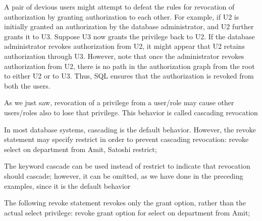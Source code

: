 \documentclass[8pt, a4paper, oneside, twocolumn]{extarticle}
\begin{document}
A pair of devious users might attempt to defeat the rules for revocation
of authorization by granting authorization to each other. For example, if U2 is
initially granted an authorization by the database administrator, and U2 further
grants it to U3. Suppose U3 now grants the privilege back to U2. If the database
administrator revokes authorization from U2, it might appear that U2 retains
authorization through U3. However, note that once the administrator revokes
authorization from U2, there is no path in the authorization graph from the root
to either U2 or to U3. Thus, SQL ensures that the authorization is revoked from
both the users.

As we just saw, revocation of a privilege from a user/role may cause other
users/roles also to lose that privilege. This behavior is called cascading revocation

In most database systems, cascading is the default behavior. However, the revoke
statement may specify restrict in order to prevent cascading revocation:
revoke select on department from Amit, Satoshi restrict;

The keyword cascade can be used instead of restrict to indicate that revocation
should cascade; however, it can be omitted, as we have done in the preceding
examples, since it is the default behavior

The following revoke statement revokes only the grant option, rather than
the actual select privilege:
revoke grant option for select on department from Amit;
\end{document}
